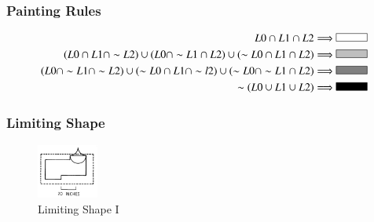 \documentclass[11pt, a4paper]{report}
\begin{document}
\subsubsection{Painting Rules}
\begin{align}
\label{fig:Shape Grammars/Shape Specification/Painting_Rule_1}
L0\cap L1\cap L2 \Longrightarrow  
\begin{tikzpicture}
    \filldraw[fill=black!00!white, draw=black] (0,0) rectangle (1,0.25);
\end{tikzpicture} \\
\label{fig:Shape Grammars/Shape Specification/Painting_Rule_2}
(L0\cap L1\cap \sim L2)\cup (L0\cap \sim L1\cap L2)\cup (\sim L0\cap L1 \cap L2) \Longrightarrow  
\begin{tikzpicture}
    \filldraw[fill=black!25!white, draw=black] (0,0) rectangle (1,0.25);
\end{tikzpicture} \\
\label{fig:Shape Grammars/Shape Specification/Painting_Rule_3}
(L0\cap \sim L1\cap \sim L2)\cup (\sim L0\cap L1\cap \sim l2)\cup (\sim L0\cap \sim L1 \cap L2) \Longrightarrow  
\begin{tikzpicture}
    \filldraw[fill=black!50!white, draw=black] (0,0) rectangle (1,0.25);
\end{tikzpicture} \\
\label{fig:Shape Grammars/Shape Specification/Painting_Rule_4}
\sim (L0\cup L1\cup L2)  \Longrightarrow  
\begin{tikzpicture}
    \filldraw[fill=black!100!white, draw=black] (0,0) rectangle (1,0.25);
\end{tikzpicture}
\end{align}
\subsubsection{Limiting Shape}
\begin{figure}[!h]
    \centering
    \includegraphics[width=2cm]{sg_specification_Limiting_shape.jpg}
    \caption{ Limiting Shape I \citep{shapeGrammars:1972}}\label{fig:Shape Grammars/Shape Specification/Limiting_Shape}
\end{figure}
\pagebreak
\end{document}
